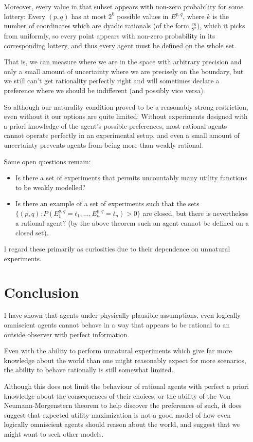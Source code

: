 Moreover, every value in that subset appears with non-zero probability for some
lottery: Every $(p, q)$
has at most $2^k$
possible values in $E^{p, q}$,
where $k$
is the number of coordinates which are dyadic rationals (of the form $\frac{m}{2^n}$),
which it picks from uniformly, so every point appears with non-zero probability
in its corresponding lottery, and thus every agent must be defined on the whole
set.

That is, we can measure where we are in the space with arbitrary precision and only
a small amount of uncertainty where we are precisely on the boundary, but we
still can't get rationality perfectly right and will sometimes declare a preference
where we should be indifferent (and possibly vice versa).

So although our naturality condition proved to be a reasonably strong restriction,
even without it our options are quite limited: Without experiments designed with
a priori knowledge of the agent's possible preferences, most rational agents
cannot operate perfectly in an experimental setup, and even a small amount of
uncertainty prevents agents from being more than weakly rational.

Some open questions remain:

\begin{itemize}
\item Is there a set of experiments that permits uncountably many utility functions
to be weakly modelled?
\item Is there an example of a set of experiments such that the sets
$\{(p, q): P(E^{p, q}_1 = t_1, \ldots, E^{p, q}_n = t_n) > 0\}$
are closed, but there is nevertheless a rational agent? (by the above theorem
such an agent cannot be defined on a closed set).
\end{itemize}

I regard these primarily as curiosities due to their dependence on unnatural experiments. 

\section{Conclusion}

I  have shown that agents under physically plausible assumptions, even logically
omniscient agents cannot behave in a way that appears to be rational to an
outside observer with perfect information.

Even with the ability to perform unnatural experiments which give far more
knowledge about the world than one might reasonably expect for more scenarios,
the ability to behave rationally is still somewhat limited.

Although this does not limit the behaviour of rational agents with perfect
a priori knowledge about the consequences of their choices, or the ability of
the Von Neumann-Morgenstern theorem to help discover the preferences of such,
it does suggest that expected utility maximization is not a good model of how
even logically omniscient agents should reason about the world, and suggest
that we might want to seek other models.

